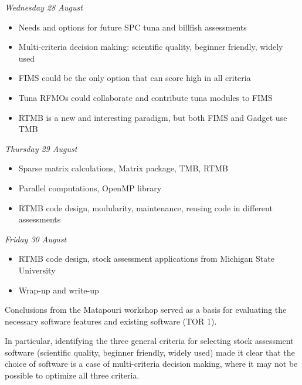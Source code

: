 \documentclass{SCreport}
\begin{document}
\textit{Wednesday 28 August}\\[-4ex]

\begin{itemize}
  \item[] Needs and options for future SPC tuna and billfish
  assessments\\[-4.5ex]
  \item[] Multi-criteria decision making: scientific quality, beginner friendly,
  widely used\\[-4.5ex]
  \item[] FIMS could be the only option that can score high in all
  criteria\\[-4.5ex]
  \item[] Tuna RFMOs could collaborate and contribute tuna modules to
  FIMS\\[-4.5ex]
  \item[] RTMB is a new and interesting paradigm, but both FIMS and Gadget use
  TMB\\[-2.5ex]
\end{itemize}

\textit{Thursday 29 August}\\[-4ex]

\begin{itemize}
  \item[] Sparse matrix calculations, Matrix package, TMB, RTMB\\[-4.5ex]
  \item[] Parallel computations, OpenMP library\\[-4.5ex]
  \item[] RTMB code design, modularity, maintenance, reusing code in different
  assessments\\[-2.5ex]
\end{itemize}

\textit{Friday 30 August}\\[-4ex]

\begin{itemize}
  \item[] RTMB code design, stock assessment applications from Michigan State
  University\\[-4.5ex]
  \item[] Wrap-up and write-up
\end{itemize}

Conclusions from the Matapouri workshop served as a basis for evaluating the
necessary software features and existing software (TOR 1).

In particular, identifying the three general criteria for selecting stock
assessment software (scientific quality, beginner friendly, widely used) made it
clear that the choice of software is a case of multi-criteria decision making,
where it may not be possible to optimize all three criteria.
\end{document}
